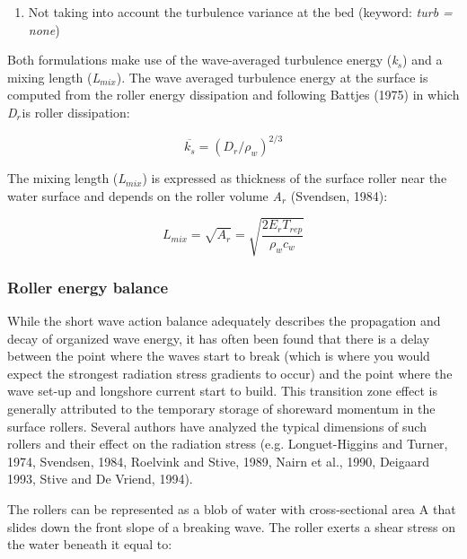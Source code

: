 \documentclass{article}
\begin{document}
\begin{enumerate}
\item  Not taking into account the turbulence variance at the bed (keyword: \textit{turb = none})
\end{enumerate}

\noindent 

\noindent Both formulations make use of the wave-averaged turbulence energy (\textit{k${}_{s}$}) and a mixing length (\textit{L${}_{mix}$}). The wave averaged turbulence energy at the surface is computed from the roller energy dissipation and following Battjes (1975) in which \textit{D${}_{r}$}${}_{ }$is roller dissipation:

\noindent 
\begin{equation} \label{2.35)} 
\overline{k_{s} }=\left(D_{r} /\rho _{w} \right)^{2/3}  
\end{equation} 


\noindent The mixing length (\textit{L${}_{mix}$}) is expressed as thickness of the surface roller near the water surface and depends on the roller volume \textit{A${}_{r}$} (Svendsen, 1984):

\noindent 
\begin{equation} \label{2.36)} 
L_{mix} =\sqrt{A_{r} } =\sqrt{\frac{2E_{r} T_{rep} }{\rho _{w} c_{w} } }  
\end{equation} 


\subsubsection{ Roller energy balance}

\noindent While the short wave action balance adequately describes the propagation and decay of organized wave energy, it has often been found that there is a delay between the point where the waves start to break (which is where you would expect the strongest radiation stress gradients to occur) and the point where the wave set-up and longshore current start to build. This transition zone effect is generally attributed to the temporary storage of shoreward momentum in the surface rollers. Several authors have analyzed the typical dimensions of such rollers and their effect on the radiation stress (e.g. Longuet-Higgins and Turner, 1974, Svendsen, 1984, Roelvink and Stive, 1989, Nairn et al., 1990, Deigaard 1993, Stive and De Vriend, 1994). 

\noindent 

\noindent The rollers can be represented as a blob of water with cross-sectional area A that slides down the front slope of a breaking wave. The roller exerts a shear stress on the water beneath it equal to:
\end{document}
